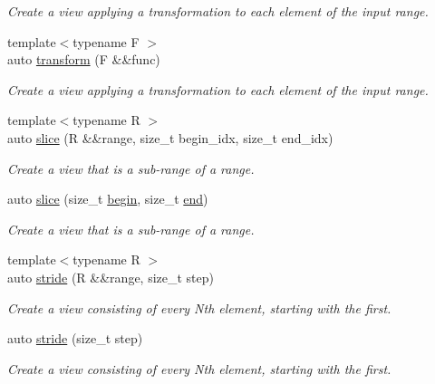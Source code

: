 \begin{DoxyCompactItemize}
\begin{DoxyCompactList}\small\item\em Create a view applying a transformation to each element of the input range. \end{DoxyCompactList}\item 
{\footnotesize template$<$typename F $>$ }\\auto \mbox{\hyperlink{namespacerah_1_1view_a814771afc1cfedc6418915550bcd5bbd}{transform}} (F \&\&func)
\begin{DoxyCompactList}\small\item\em Create a view applying a transformation to each element of the input range. \end{DoxyCompactList}\item 
{\footnotesize template$<$typename R $>$ }\\auto \mbox{\hyperlink{namespacerah_1_1view_a4e7a243408052f64886e6349650df16c}{slice}} (R \&\&range, size\+\_\+t begin\+\_\+idx, size\+\_\+t end\+\_\+idx)
\begin{DoxyCompactList}\small\item\em Create a view that is a sub-\/range of a range. \end{DoxyCompactList}\item 
auto \mbox{\hyperlink{namespacerah_1_1view_a727bbf69817ca3e940597885764e2032}{slice}} (size\+\_\+t \mbox{\hyperlink{namespacerah_a2c4a19e57cc4e0753e93830f247def6d}{begin}}, size\+\_\+t \mbox{\hyperlink{namespacerah_aaddd1442cd76b96876e692cdefe7261d}{end}})
\begin{DoxyCompactList}\small\item\em Create a view that is a sub-\/range of a range. \end{DoxyCompactList}\item 
{\footnotesize template$<$typename R $>$ }\\auto \mbox{\hyperlink{namespacerah_1_1view_ad71e78df55f6f9416e2869a8c14f6779}{stride}} (R \&\&range, size\+\_\+t step)
\begin{DoxyCompactList}\small\item\em Create a view consisting of every Nth element, starting with the first. \end{DoxyCompactList}\item 
auto \mbox{\hyperlink{namespacerah_1_1view_abed0df62d7146e5d0905725efab0e40e}{stride}} (size\+\_\+t step)
\begin{DoxyCompactList}\small\item\em Create a view consisting of every Nth element, starting with the first. \end{DoxyCompactList}\item 

\end{DoxyCompactItemize}
